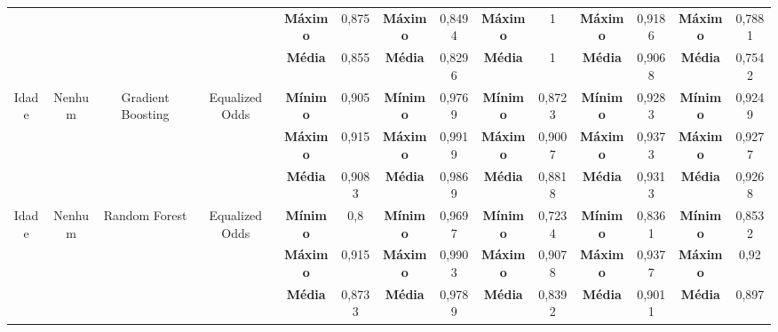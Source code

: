 \documentclass[portugues]{ic-tese}
\begin{document}
\begin{table}[H]
\begin{center}
{\begin{tabular}{c|c|c|c|c|c|c|c|c|c|c|c|c|c}
             & & & & \textbf{Máximo} & 0,875 & \textbf{Máximo} & 0,8494 & \textbf{Máximo} & 1 & \textbf{Máximo} & 0,9186 & \textbf{Máximo} & 0,7881 \\
             & & & & \textbf{Média} & 0,855 & \textbf{Média} & 0,8296 & \textbf{Média} & 1 & \textbf{Média} & 0,9068 & \textbf{Média} & 0,7542 \\
            \hline
            \multirow{3}{*}{Idade} & \multirow{3}{*}{Nenhum} & \multirow{3}{*}{Gradient Boosting} & \multirow{3}{*}{Equalized Odds} & \textbf{Mínimo} & 0,905 & \textbf{Mínimo} & 0,9769 & \textbf{Mínimo} & 0,8723 & \textbf{Mínimo} & 0,9283 & \textbf{Mínimo} & 0,9249 \\
             & & & & \textbf{Máximo} & 0,915 & \textbf{Máximo} & 0,9919 & \textbf{Máximo} & 0,9007 & \textbf{Máximo} & 0,9373 & \textbf{Máximo} & 0,9277 \\
             & & & & \textbf{Média} & 0,9083 & \textbf{Média} & 0,9869 & \textbf{Média} & 0,8818 & \textbf{Média} & 0,9313 & \textbf{Média} & 0,9268 \\
            \hline
            \multirow{3}{*}{Idade} & \multirow{3}{*}{Nenhum} & \multirow{3}{*}{Random Forest} & \multirow{3}{*}{Equalized Odds} & \textbf{Mínimo} & 0,8 & \textbf{Mínimo} & 0,9697 & \textbf{Mínimo} & 0,7234 & \textbf{Mínimo} & 0,8361 & \textbf{Mínimo} & 0,8532 \\
             & & & & \textbf{Máximo} & 0,915 & \textbf{Máximo} & 0,9903 & \textbf{Máximo} & 0,9078 & \textbf{Máximo} & 0,9377 & \textbf{Máximo} & 0,92 \\
             & & & & \textbf{Média} & 0,8733 & \textbf{Média} & 0,9789 & \textbf{Média} & 0,8392 & \textbf{Média} & 0,9011 & \textbf{Média} & 0,897 \\
        \end{tabular}}
    \end{center}
\end{table}
\end{document}
